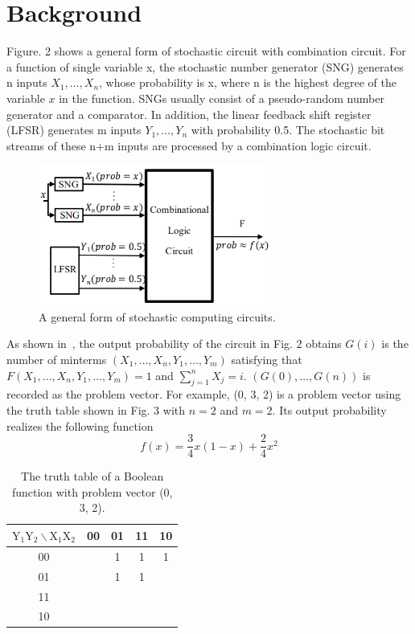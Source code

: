 \documentclass[conference,letterpaper]{IEEEtran}
\begin{document}
\section*{Background}
Figure. 2 shows a general form of stochastic circuit with combination circuit. For a function of single variable x, the stochastic number generator (SNG) generates n inputs $X_{1}, \ldots, X_{n}$, whose probability is x, where n is the highest degree of the variable $x$ in the function. SNGs usually consist of a pseudo-random number generator and a comparator. In addition, the linear feedback shift register (LFSR) generates m inputs $Y_{1}, \ldots, Y_{n}$ with probability 0.5. The stochastic bit streams of these n+m inputs are processed by a combination logic circuit.
\begin{figure}[htbp]
	\centering
	\includegraphics[width=3in]{fig/sc.png}	
	\caption{A general form of stochastic computing circuits.} 
\end{figure}

As shown in~\cite{2}, the output probability of the circuit in Fig. 2 obtains $G(i)$ is the number of minterms $(X_{1}, \ldots, X_{n}, Y_{1}, \ldots, Y_{m})$ satisfying that $F(X_{1}, \ldots, X_{n}, Y_{1}, \ldots, Y_{m})=1$ and $\sum_{j=1}^{n} X_{j}=i$. $(G(0), \ldots, G(n))$ is recorded as the problem vector. For example, (0, 3, 2) is a problem vector using the truth table shown in Fig. 3 with $n=2$ and $m=2$. Its output probability realizes the following function
\begin{equation}
f(x)=\frac{3}{4} x(1-x)+\frac{2}{4} x^{2}
\end{equation}

\begin{table}[htbp]
\setlength{\abovecaptionskip}{0.cm}
\setlength{\belowcaptionskip}{0.pt}
\setlength{\tabcolsep}{1mm}
\caption{The truth table of a Boolean function with problem vector (0, 3, 2).}
\centering
\begin{tabular}{|c|c|c|c|c|}
\hline $\mathrm{Y}_{1} \mathrm{Y}_{2} \backslash \mathrm{X}_{1} \mathrm{X}_{2}$ & 00 & 01 & 11 & 10 \\
\hline 00 & & 1 & 1 & 1 \\
\hline 01 & & 1 & 1 & \\
\hline 11 & & & & \\
\hline 10 & & & & \\
\hline
\end{tabular}
\end{table}
\end{document}
